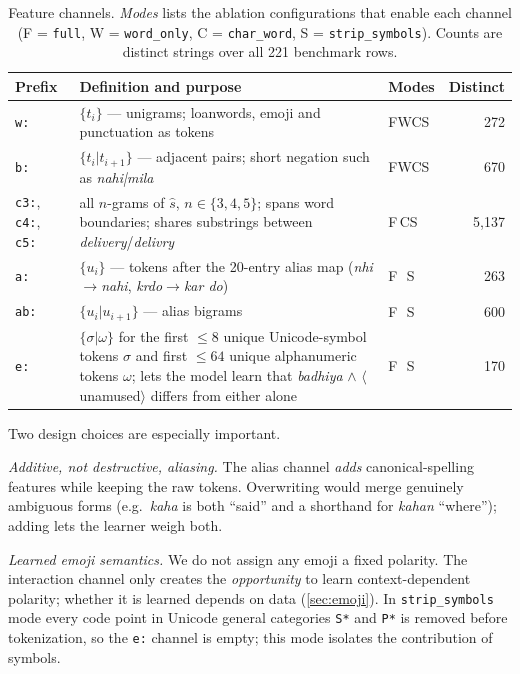 \documentclass[11pt,a4paper]{article}
\theoremstyle{remark}
\newcommand{\lbl}[1]{\texttt{#1}}                      %
\newcommand{\hi}[1]{\textit{#1}}                       %
\newcommand{\emo}[1]{\textsf{\small$\langle$#1$\rangle$}} %
\begin{document}
\begin{table}[h]
\centering\small
\caption{Feature channels. \emph{Modes} lists the ablation configurations
that enable each channel (F = \lbl{full}, W = \lbl{word\_only}, C =
\lbl{char\_word}, S = \lbl{strip\_symbols}). Counts are distinct strings over
all 221 benchmark rows.}
\label{tab:features}
\begin{tabularx}{\linewidth}{@{}l X l r@{}}
\toprule
Prefix & Definition and purpose & Modes & Distinct \\
\midrule
\texttt{w:}  & $\{t_i\}$ --- unigrams; loanwords, emoji and punctuation as tokens & FWCS & 272 \\
\texttt{b:}  & $\{t_i|t_{i+1}\}$ --- adjacent pairs; short negation such as \hi{nahi|mila} & FWCS & 670 \\
\texttt{c3:}, \texttt{c4:}, \texttt{c5:} & all $n$-grams of $\hat s$, $n\in\{3,4,5\}$; spans word boundaries; shares substrings between \hi{delivery}/\hi{delivry} & F\,CS & 5{,}137 \\
\texttt{a:}  & $\{u_i\}$ --- tokens after the 20-entry alias map (\hi{nhi}$\to$\hi{nahi}, \hi{krdo}$\to$\hi{kar do}) & F\,\,\,\,S & 263 \\
\texttt{ab:} & $\{u_i|u_{i+1}\}$ --- alias bigrams & F\,\,\,\,S & 600 \\
\texttt{e:}  & $\{\sigma|\omega\}$ for the first $\le\!8$ unique Unicode-symbol tokens $\sigma$ and first $\le\!64$ unique alphanumeric tokens $\omega$; lets the model learn that \hi{badhiya} $\wedge$ \emo{unamused} differs from either alone & F\,\,\,\,S & 170 \\
\bottomrule
\end{tabularx}
\end{table}

Two design choices are especially important.

\emph{Additive, not destructive, aliasing.} The alias channel \emph{adds}
canonical-spelling features while keeping the raw tokens. Overwriting would
merge genuinely ambiguous forms (e.g.\ \hi{kaha} is both ``said'' and a
shorthand for \hi{kahan} ``where''); adding lets the learner weigh both.

\emph{Learned emoji semantics.} We do not assign any emoji a fixed polarity. The
interaction channel only creates the \emph{opportunity} to learn
context-dependent polarity; whether it is learned depends on data
(\cref{sec:emoji}). In \lbl{strip\_symbols} mode every code point in Unicode
general categories \texttt{S*} and \texttt{P*} is removed before tokenization,
so the \texttt{e:} channel is empty; this mode isolates the contribution of
symbols.
\end{document}
